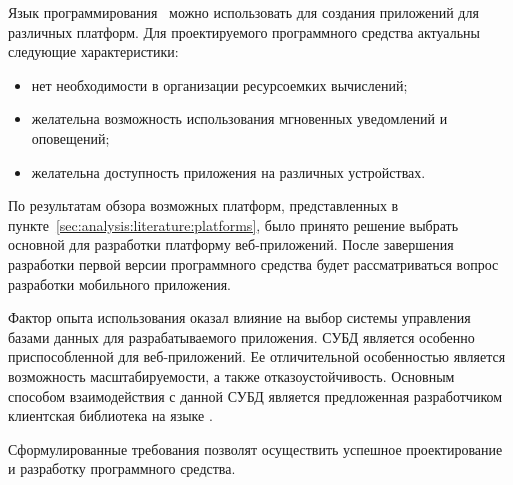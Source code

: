 Язык программирования \typescript~можно использовать для создания приложений для различных платформ. Для проектируемого программного сре\-д\-с\-т\-ва актуальны следующие характеристики:
\begin{itemize}
  \item нет необходимости в организации ресурсоемких вычислений;
  \item желательна возможность использования мгновенных уведомлений и оповещений;
  \item желательна доступность приложения на различных устройствах.
\end{itemize}

По результатам обзора возможных платформ, представленных в пункте~\ref{sec:analysis:literature:platforms}, было принято решение выбрать основной для разработки платформу веб-приложений. После завершения разработки первой версии программного средства будет рассматриваться вопрос разработки мобильного приложения.

Фактор опыта использования оказал влияние на выбор системы управления базами данных для разрабатываемого приложения. СУБД \nezaboodka является особенно приспособленной для веб-приложений. Ее отличительной особенностью является возможность масштабируемости, а также отказоустойчивость. Основным способом взаимодействия с данной СУБД является предложенная разработчиком клиентская библиотека на языке \csharp.

Сформулированные требования позволят осуществить успешное проектирование и разработку программного средства.
